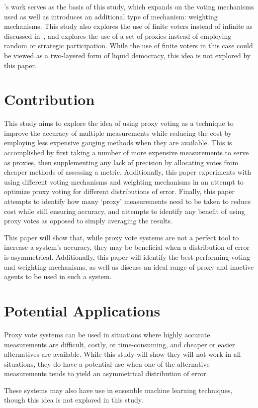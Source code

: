 's work serves as the basis of this study, which expands on
the voting mechanisms used as well as introduces an additional type of
mechanism: weighting mechanisms.
This study also explores the use of finite voters instead of infinite as discussed
in~\cite{Cohensius2017}, and explores the use of a set of proxies instead of
employing random or strategic participation.
While the use of finite voters in this case could be viewed as a two-layered
form of liquid democracy, this idea is not explored by this paper.


\section{Contribution}\label{sec:contribution}
This study aims to explore the idea of using proxy voting as a technique to
improve the accuracy of multiple measurements while reducing the cost by
employing less expensive gauging methods when they are available.
This is accomplished by first taking a number of more expensive measurements to
serve as proxies, then supplementing any lack of precision by allocating
votes from cheaper methods of assessing a metric.
Additionally, this paper experiments with using different voting mechanisms and
weighting mechanisms in an attempt to optimize proxy voting for different
distributions of error.
Finally, this paper attempts to identify how many `proxy' measurements need
to be taken to reduce cost while still ensuring accuracy, and attempts to
identify any benefit of using proxy votes as opposed to simply averaging the
results.

This paper will show that, while proxy vote systems are not a perfect tool to
increase a system's accuracy, they may be beneficial when a distribution of error is
asymmetrical.
Additionally, this paper will identify the best performing voting and weighting
mechanisms, as well as discuss an ideal range of proxy and inactive agents to be used
in such a system.


\section{Potential Applications}\label{sec:potential-applications}
Proxy vote systems can be used in situations where highly accurate measurements are
difficult, costly, or time-consuming, and cheaper or easier alternatives are available.
While this study will show they will not work in all situations, they do have a
potential use when one of the alternative measurements tends to yield an asymmetrical
distribution of error.

These systems may also have use in ensemble machine learning techniques, though this
idea is not explored in this study.
